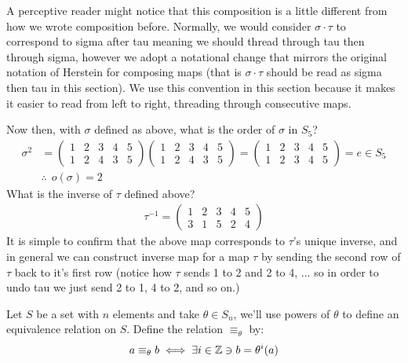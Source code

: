 A perceptive reader might notice that this composition is a little different from how we wrote composition before. Normally, we would consider $\sigma \cdot \tau$ to correspond to sigma after tau meaning we should thread through tau then through sigma, however we adopt a notational change that mirrors the original notation of Herstein for composing maps (that is $\sigma \cdot \tau$ should be read as sigma then tau in this section). We use this convention in this section because it makes it easier to read from left to right, threading through consecutive maps.

Now then, with $\sigma$ defined as above, what is the order of $\sigma$ in $S_5$?
\begin{align}
    \sigma^2&=\begin{pmatrix}
    1&2&3&4&5 \\ 1&2&4&3&5
    \end{pmatrix}\begin{pmatrix}
    1&2&3&4&5 \\ 1&2&4&3&5
    \end{pmatrix} = \begin{pmatrix}
    1&2&3&4&5 \\ 1&2&3&4&5
    \end{pmatrix} = e \in S_5 \nonumber \\
    &\therefore \ \ o(\sigma)=2 \nonumber
\end{align}
What is the inverse of $\tau$ defined above?
\begin{align}
    \tau^{-1}= \begin{pmatrix}
    1&2&3&4&5 \\ 3&1&5&2&4
    \end{pmatrix}\nonumber
\end{align}
It is simple to confirm that the above map corresponds to $\tau$'s unique inverse, and in general we can construct inverse map for a map $\tau$ by sending the second row of $\tau$ back to it's first row (notice how $\tau$ sends 1 to 2 and 2 to 4, ... so in order to undo tau we just send 2 to 1, 4 to 2, and so on.)

Let $S$ be a set with $n$ elements and take $\theta \in S_n$, we'll use powers of $\theta$ to define an equivalence relation on $S$. Define the relation $\equiv_{\theta}$ by:
\begin{align}
    a\equiv_{\theta} b \iff \exists i \in {\mathbb{ Z}} \ni b= \theta^i(a) \nonumber
\end{align}

